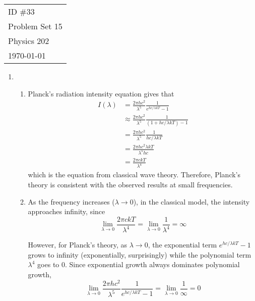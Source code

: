 \documentclass[fleqn]{article}[12pt]
\begin{document}
    \begin{tabular}{l}
        ID \#33 \\
        Problem Set 15 \\
        Physics 202 \\
        \today
    \end{tabular}

\begin{enumerate}
    \item \begin{enumerate}
        \item Planck's radiation intensity equation gives that
        \begin{align*}
            I(\lambda) &= \frac{2\pi h c^2}{\lambda^5}\frac{1}{e^{hc/\lambda k T} - 1} \\
            &\approx
             \frac{2\pi h c^2}{\lambda^5}\frac{1}{(1 + hc/\lambda k T) - 1} \\
            &= \frac{2\pi h c^2}{\lambda^5}\frac{1}{hc/\lambda k T} \\
            &= \frac{2\pi h c^2\lambda k T}{\lambda^5 hc} \\
             &= \frac{2\pi c k T}{\lambda^4}
        \end{align*}
        which is the equation from classical wave theory. Therefore, Planck's theory is consistent with the observed results at small frequencies.

        \item As the frequency increases ($\lambda\to0$), in the classical model, the intensity approaches infinity, since
        \begin{equation*}
            \lim_{\lambda \to 0} \frac{2\pi c k T}{\lambda^4} = \lim_{\lambda \to 0} \frac{1}{\lambda^4} = \infty
        \end{equation*}

        However, for Planck's theory, as $\lambda \to 0$, the exponential term $e^{hc/\lambda k T}-1$ grows to infinity (exponentially, surprisingly) while the polynomial term $\lambda^4$ goes to 0. Since exponential growth always dominates polynomial growth,
        \begin{equation*}
            \lim_{\lambda\to 0} \frac{2\pi h c^2}{\lambda^5}\frac{1}{e^{hc/\lambda k T} - 1} = \lim_{\lambda\to 0} \frac{1}{\infty} = 0
        \end{equation*}

    \end{enumerate}


\end{enumerate}
\end{document}
